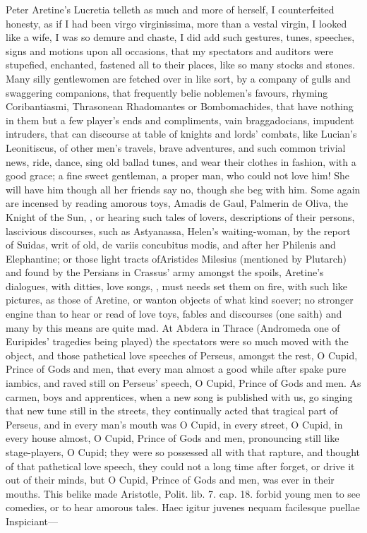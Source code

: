 Peter Aretine's Lucretia telleth as much and more of herself, I
counterfeited honesty, as if I had been virgo virginissima, more than a
vestal virgin, I looked like a wife, I was so demure and chaste, I did
add such gestures, tunes, speeches, signs and motions upon all
occasions, that my spectators and auditors were stupefied, enchanted,
fastened all to their places, like so many stocks and stones. Many
silly gentlewomen are fetched over in like sort, by a company of gulls
and swaggering companions, that frequently belie noblemen's favours,
rhyming Coribantiasmi, Thrasonean Rhadomantes or Bombomachides, that
have nothing in them but a few player's ends and compliments, vain
braggadocians, impudent intruders, that can discourse at table of
knights and lords' combats, like Lucian's Leonitiscus, of other
men's travels, brave adventures, and such common trivial news, ride,
dance, sing old ballad tunes, and wear their clothes in fashion, with a
good grace; a fine sweet gentleman, a proper man, who could not love
him! She will have him though all her friends say no, though she beg
with him. Some again are incensed by reading amorous toys, Amadis de
Gaul, Palmerin de Oliva, the Knight of the Sun, \etc{}, or hearing such
tales of lovers, descriptions of their persons, lascivious
discourses, such as Astyanassa, Helen's waiting-woman, by the report of
Suidas, writ of old, de variis concubitus modis, and after her Philenis
and Elephantine; or those light tracts ofAristides Milesius
(mentioned by Plutarch) and found by the Persians in Crassus' army
amongst the spoils, Aretine's dialogues, with ditties, love songs, \etc{},
must needs set them on fire, with such like pictures, as those of
Aretine, or wanton objects of what kind soever; no stronger engine than
to hear or read of love toys, fables and discourses (one saith)
and many by this means are quite mad. At Abdera in Thrace (Andromeda
one of Euripides' tragedies being played) the spectators were so much
moved with the object, and those pathetical love speeches of Perseus,
amongst the rest, O Cupid, Prince of Gods and men, \etc{} that every man
almost a good while after spake pure iambics, and raved still on
Perseus' speech, O Cupid, Prince of Gods and men. As carmen, boys and
apprentices, when a new song is published with us, go singing that new
tune still in the streets, they continually acted that tragical part of
Perseus, and in every man's mouth was O Cupid, in every street, O
Cupid, in every house almost, O Cupid, Prince of Gods and men,
pronouncing still like stage-players, O Cupid; they were so possessed
all with that rapture, and thought of that pathetical love speech, they
could not a long time after forget, or drive it out of their minds, but
O Cupid, Prince of Gods and men, was ever in their mouths. This belike
made Aristotle, Polit. lib. 7. cap. 18. forbid young men to see
comedies, or to hear amorous tales.
Haec igitur juvenes nequam facilesque puellae
Inspiciant---

